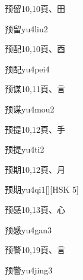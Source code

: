\begin{entry}{预留}{10,10}{⾴、⽥}
  \begin{phonetics}{预留}{yu4liu2}
  \end{phonetics}
\end{entry}

\begin{entry}{预配}{10,10}{⾴、⾣}
  \begin{phonetics}{预配}{yu4pei4}
  \end{phonetics}
\end{entry}

\begin{entry}{预谋}{10,11}{⾴、⾔}
  \begin{phonetics}{预谋}{yu4mou2}
  \end{phonetics}
\end{entry}

\begin{entry}{预提}{10,12}{⾴、⼿}
  \begin{phonetics}{预提}{yu4ti2}
  \end{phonetics}
\end{entry}

\begin{entry}{预期}{10,12}{⾴、⽉}
  \begin{phonetics}{预期}{yu4qi1}[][HSK 5]
  \end{phonetics}
\end{entry}

\begin{entry}{预感}{10,13}{⾴、⼼}
  \begin{phonetics}{预感}{yu4gan3}
  \end{phonetics}
\end{entry}

\begin{entry}{预警}{10,19}{⾴、⾔}
  \begin{phonetics}{预警}{yu4jing3}
  \end{phonetics}
\end{entry}

